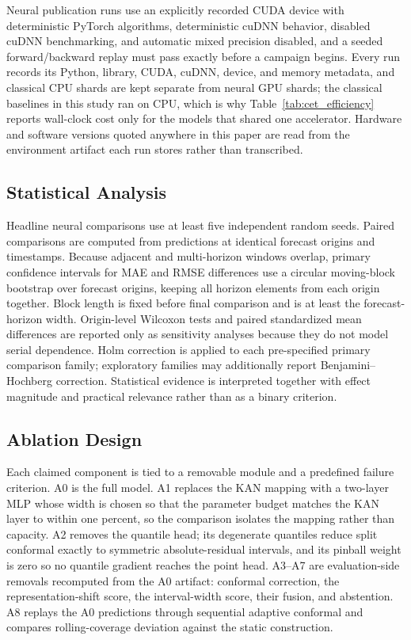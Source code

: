 Neural publication runs use an explicitly recorded CUDA device with deterministic PyTorch algorithms, deterministic cuDNN behavior, disabled cuDNN benchmarking, and automatic mixed precision disabled, and a seeded forward/backward replay must pass exactly before a campaign begins. Every run records its Python, library, CUDA, cuDNN, device, and memory metadata, and classical CPU shards are kept separate from neural GPU shards; the classical baselines in this study ran on CPU, which is why Table~\ref{tab:cet_efficiency} reports wall-clock cost only for the models that shared one accelerator. Hardware and software versions quoted anywhere in this paper are read from the environment artifact each run stores rather than transcribed.

\subsection{Statistical Analysis}
Headline neural comparisons use at least five independent random seeds. Paired comparisons are computed from predictions at identical forecast origins and timestamps. Because adjacent and multi-horizon windows overlap, primary confidence intervals for MAE and RMSE differences use a circular moving-block bootstrap over forecast origins, keeping all horizon elements from each origin together. Block length is fixed before final comparison and is at least the forecast-horizon width. Origin-level Wilcoxon tests and paired standardized mean differences are reported only as sensitivity analyses because they do not model serial dependence. Holm correction is applied to each pre-specified primary comparison family; exploratory families may additionally report Benjamini--Hochberg correction. Statistical evidence is interpreted together with effect magnitude and practical relevance rather than as a binary criterion.

\subsection{Ablation Design}
Each claimed component is tied to a removable module and a predefined failure criterion. A0 is the full model. A1 replaces the KAN mapping with a two-layer MLP whose width is chosen so that the parameter budget matches the KAN layer to within one percent, so the comparison isolates the mapping rather than capacity. A2 removes the quantile head; its degenerate quantiles reduce split conformal exactly to symmetric absolute-residual intervals, and its pinball weight is zero so no quantile gradient reaches the point head. A3--A7 are evaluation-side removals recomputed from the A0 artifact: conformal correction, the representation-shift score, the interval-width score, their fusion, and abstention. A8 replays the A0 predictions through sequential adaptive conformal and compares rolling-coverage deviation against the static construction.

